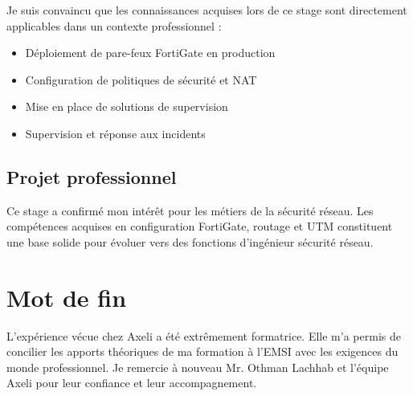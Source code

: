Je suis convaincu que les connaissances acquises lors de ce stage sont directement applicables dans un contexte professionnel :
\begin{itemize}
    \item Déploiement de pare-feux FortiGate en production
    \item Configuration de politiques de sécurité et NAT
    \item Mise en place de solutions de supervision
    \item Supervision et réponse aux incidents
\end{itemize}

\subsection{Projet professionnel}

Ce stage a confirmé mon intérêt pour les métiers de la sécurité réseau. Les compétences acquises en configuration FortiGate, routage et UTM constituent une base solide pour évoluer vers des fonctions d'ingénieur sécurité réseau.

\section{Mot de fin}

L'expérience vécue chez Axeli a été extrêmement formatrice. Elle m'a permis de concilier les apports théoriques de ma formation à l'EMSI avec les exigences du monde professionnel. Je remercie à nouveau Mr. Othman Lachhab et l'équipe Axeli pour leur confiance et leur accompagnement.
